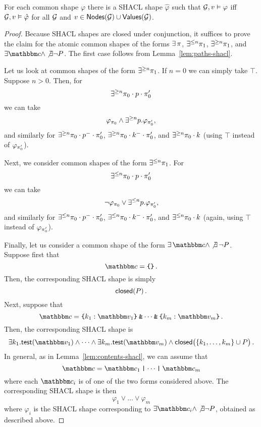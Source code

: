 

\begin{lemma}
\label{lem:shapes-shacl}
For each common shape $\varphi$ there is a SHACL shape $\hat \varphi$ such that  $\mathcal{G}, v\vDash \varphi$ iff $\mathcal{G},v\vDash \hat \varphi$ for all $\mathcal{G}$ and $v\in\mathsf{Nodes}(\mathcal{G})  \cup \mathsf{Values}(\mathcal{G})$. 
\end{lemma}

\begin{proof} 
Because SHACL shapes are closed under conjunction, it suffices to prove the claim for the atomic common shapes of the forms $\exists\, \pi$, $\exists^{\leq n}\pi_1$, $\exists^{\geq n}\pi_1$, and $\exists \ntype \land \not\exists\lnot P$. The first case follows from Lemma~\ref{lem:paths-shacl}. 

Let us look at common shapes of the form
$\exists^{\geq n}\pi_1$. If $n=0$ we can simply take $\top$. Suppose $n>0$. Then, for \[\exists^{\geq n} \pi_0\cdot p\cdot \pi'_0\] we can take \[\varphi_{\pi_0} \land \exists^{\geq n}p. \varphi_{\pi'_0},\] and similarly for $\exists^{\geq n}\pi_0\cdot p^{-}\cdot \pi'_0$, $\exists^{\geq n}\pi_0\cdot k^{-}\cdot \pi'_0$, and $\exists^{\geq n}\pi_0\cdot k$ (using $\top$ instead of $\varphi_{\pi'_0}$). 

Next, we consider common shapes of the form 
$\exists^{\leq n}\pi_1$. For \[\exists^{\leq n} \pi_0\cdot p\cdot \pi'_0\] we can take \[\lnot\varphi_{\pi_0} \lor \exists^{\leq n}p. \varphi_{\pi'_0},\] and similarly for $\exists^{\leq n}\pi_0\cdot p^{-}\cdot \pi'_0$, $\exists^{\leq n}\pi_0\cdot k^{-}\cdot \pi'_0$, and $\exists^{\leq n}\pi_0\cdot k$ (again, using $\top$ instead of $\varphi_{\pi'_0}$).

Finally, let us consider a common shape of the form $\exists\, \ntype \land \not\exists\,\lnot P$. Suppose first that \[\ntype = \closedRT{}\,.\] Then, the corresponding SHACL shape is simply \[\mathsf{closed}(P)\,.\] Next, suppose that \[\ntype = \closedRT{k_1:\vtype_1}\tAnd \dots \tAnd \closedRT{k_m :\vtype_m}\,.\] 
Then, the corresponding SHACL shape is 
\[
\exists k_1.\test(\vtype_1) \land \dots \land \exists k_m.\test(\vtype_m) \land \closed\big(\{k_1, \dots,k_m\} \cup P\big)\,.\]
In general, as in Lemma~\ref{lem:contents-shacl}, we can assume that 
\[\ntype = \ntype_1 \tOr \dots \tOr \ntype_m\] where each $\ntype_i$ is of one of the two forms considered above. The corresponding SHACL shape is then 
\[\varphi_1 \lor \dots \lor \varphi_m\] where $\varphi_i$ is the SHACL shape corresponding to $\exists \ntype_i \land \not\exists\lnot P$, obtained as described above. 
\end{proof}

